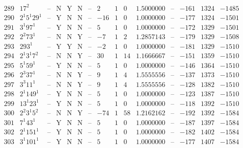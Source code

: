 \documentclass[11pt,reqno,a4letter]{article}
\numberwithin{figure}{section}
\numberwithin{table}{section}
\theoremstyle{plain}
\numberwithin{theorem}{section}
\theoremstyle{definition}
\begin{document}
\begin{table}[h!]
\begin{equation*}
{\begin{array}{|cc|c|ccc|c|c|ccc|c|ccc}
 289 & 17^2 & \text{--} & \text{N} & \text{Y} & \text{N} & \text{--} & 2 & 1 & 0 & 1.5000000 & \text{--} & -161 & 1324 & -1485 \\
 290 & 2^1 5^1 29^1 & \text{--} & \text{Y} & \text{N} & \text{N} & \text{--} & -16 & 1 & 0 & 1.0000000 & \text{--} & -177 & 1324 & -1501 \\
 291 & 3^1 97^1 & \text{--} & \text{Y} & \text{N} & \text{N} & \text{--} & 5 & 1 & 0 & 1.0000000 & \text{--} & -172 & 1329 & -1501 \\
 292 & 2^2 73^1 & \text{--} & \text{N} & \text{N} & \text{Y} & \text{--} & -7 & 1 & 2 & 1.2857143 & \text{--} & -179 & 1329 & -1508 \\
 293 & 293^1 & \text{--} & \text{Y} & \text{Y} & \text{N} & \text{--} & -2 & 1 & 0 & 1.0000000 & \text{--} & -181 & 1329 & -1510 \\
 294 & 2^1 3^1 7^2 & \text{--} & \text{N} & \text{N} & \text{Y} & \text{--} & 30 & 1 & 14 & 1.1666667 & \text{--} & -151 & 1359 & -1510 \\
 295 & 5^1 59^1 & \text{--} & \text{Y} & \text{N} & \text{N} & \text{--} & 5 & 1 & 0 & 1.0000000 & \text{--} & -146 & 1364 & -1510 \\
 296 & 2^3 37^1 & \text{--} & \text{N} & \text{N} & \text{Y} & \text{--} & 9 & 1 & 4 & 1.5555556 & \text{--} & -137 & 1373 & -1510 \\
 297 & 3^3 11^1 & \text{--} & \text{N} & \text{N} & \text{Y} & \text{--} & 9 & 1 & 4 & 1.5555556 & \text{--} & -128 & 1382 & -1510 \\
 298 & 2^1 149^1 & \text{--} & \text{Y} & \text{N} & \text{N} & \text{--} & 5 & 1 & 0 & 1.0000000 & \text{--} & -123 & 1387 & -1510 \\
 299 & 13^1 23^1 & \text{--} & \text{Y} & \text{N} & \text{N} & \text{--} & 5 & 1 & 0 & 1.0000000 & \text{--} & -118 & 1392 & -1510 \\
 300 & 2^2 3^1 5^2 & \text{--} & \text{N} & \text{N} & \text{Y} & \text{--} & -74 & 1 & 58 & 1.2162162 & \text{--} & -192 & 1392 & -1584 \\
 301 & 7^1 43^1 & \text{--} & \text{Y} & \text{N} & \text{N} & \text{--} & 5 & 1 & 0 & 1.0000000 & \text{--} & -187 & 1397 & -1584 \\
 302 & 2^1 151^1 & \text{--} & \text{Y} & \text{N} & \text{N} & \text{--} & 5 & 1 & 0 & 1.0000000 & \text{--} & -182 & 1402 & -1584 \\
 303 & 3^1 101^1 & \text{--} & \text{Y} & \text{N} & \text{N} & \text{--} & 5 & 1 & 0 & 1.0000000 & \text{--} & -177 & 1407 & -1584 \\

\end{array}}
\end{equation*}
\end{table}
\end{document}
